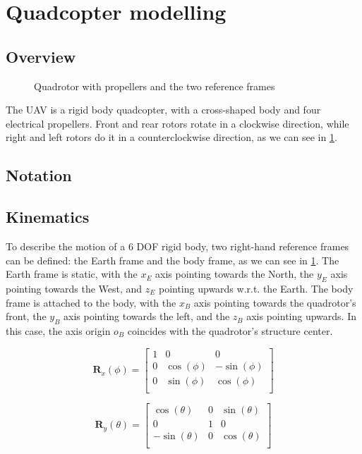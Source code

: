 \documentclass[journal]{IEEEtran}
\begin{document}
\section{Quadcopter modelling}
	\subsection{Overview}
		
		\begin{figure}
			\centering
			
			\caption{Quadrotor with propellers and the two reference frames}
			\label{fig:frames_rotors}
		\end{figure}

	The UAV is a rigid body quadcopter, with a cross-shaped body and four electrical propellers. Front and rear rotors rotate in a clockwise direction, while right and left rotors do it in a counterclockwise direction, as we can see in \figurename \ref{fig:frames_rotors}. 
	\subsection{Notation}
	\subsection{Kinematics}
	To describe the motion of a 6 DOF rigid body, two right-hand reference frames can be defined: the Earth frame and the body frame, as we can see in \figurename \ref{fig:frames_rotors}. The Earth frame is static, with the $x_E$ axis pointing towards the North, the $y_E$ axis pointing towards the West, and $z_E$ pointing upwards w.r.t. the Earth. The body frame is attached to the body, with the $x_B$ axis pointing towards the quadrotor's front, the $y_B$ axis pointing towards the left, and the $z_B$ axis pointing upwards. In this case, the axis origin $o_B$ coincides with the quadrotor's structure center. 
	
	 \begin{equation} \label{eq:rotx}
	 	\bm{R}_x (\phi)=
	 	\left[ {\begin{array}{ccc}
	 		1 & 0 & 0 \\
	 		0 & \cos(\phi) & -\sin(\phi) \\
	 		0 &  \sin(\phi) & \cos(\phi) \\ 
	 		\end{array} } \right]
	 \end{equation}  

	
	\begin{equation} \label{eq:roty}
	\bm{R}_y (\theta)=
	\left[ {\begin{array}{ccc}
		\cos(\theta) & 0 & \sin(\theta) \\
		0 & 1 & 0 \\
		-\sin(\theta) &  0 & \cos(\theta) \\ 
		\end{array} } \right]
	 \end{equation}  
	
\end{document}

